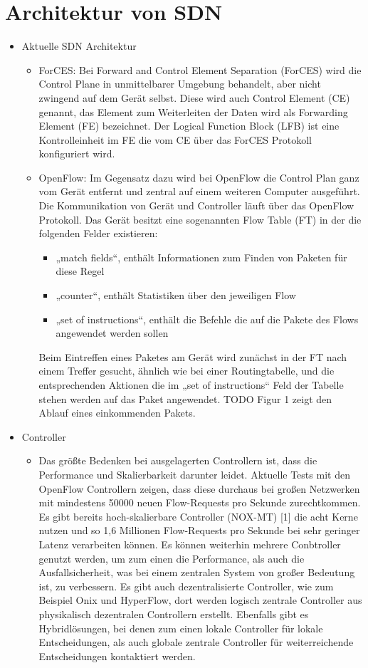 \documentclass[twoside,12pt]{scrartcl}
\begin{document}
	\section{Architektur von SDN}
	\begin{itemize}
		\item Aktuelle SDN Architektur
		\begin{itemize}
			\item ForCES: Bei Forward and Control Element Separation (ForCES) wird die Control Plane in unmittelbarer Umgebung behandelt, aber nicht zwingend auf dem Gerät selbst. Diese wird auch Control Element (CE) genannt, das Element zum Weiterleiten der Daten wird als Forwarding Element (FE) bezeichnet. Der Logical Function Block (LFB) ist eine Kontrolleinheit im FE die vom CE über das ForCES Protokoll konfiguriert wird.
			\item OpenFlow: Im Gegensatz dazu wird bei OpenFlow die Control Plan ganz vom Gerät entfernt und zentral auf einem weiteren Computer ausgeführt. Die Kommunikation von Gerät und Controller läuft über das OpenFlow Protokoll. Das Gerät besitzt eine sogenannten Flow Table (FT) in der die folgenden Felder existieren: 
			\begin{itemize}
				\item „match fields“, enthält Informationen zum Finden von Paketen für diese Regel
				\item „counter“, enthält Statistiken über den jeweiligen Flow
				\item „set of instructions“, enthält die Befehle die auf die Pakete des Flows angewendet werden sollen
				\end{itemize}
Beim Eintreffen eines Paketes am Gerät wird zunächst in der FT nach einem Treffer gesucht, ähnlich wie bei einer Routingtabelle, und die entsprechenden Aktionen die im „set of instructions“ Feld der Tabelle stehen werden auf das Paket angewendet.
TODO Figur 1 zeigt den Ablauf eines einkommenden Pakets.
		\end{itemize}
		\item Controller
		\begin{itemize}
			\item Das größte Bedenken bei ausgelagerten Controllern ist, dass die Performance und Skalierbarkeit darunter leidet. Aktuelle Tests mit den OpenFlow Controllern zeigen, dass diese durchaus bei großen Netzwerken mit mindestens 50000 neuen Flow-Requests pro Sekunde zurechtkommen. Es gibt bereits hoch-skalierbare Controller (NOX-MT) [1] die acht Kerne nutzen und so 1,6 Millionen Flow-Requests pro Sekunde bei sehr geringer Latenz verarbeiten können. Es können weiterhin mehrere Conbtroller genutzt werden, um zum einen die Performance, als auch die Ausfallsicherheit, was bei einem zentralen System von großer Bedeutung ist, zu verbessern. Es gibt auch dezentralisierte Controller, wie zum Beispiel Onix und HyperFlow, dort werden logisch zentrale Controller aus physikalisch dezentralen Controllern erstellt. Ebenfalls gibt es Hybridlösungen, bei denen zum einen lokale Controller für lokale Entscheidungen, als auch globale zentrale Controller für weiterreichende Entscheidungen kontaktiert werden.

\end{itemize}
\end{itemize}
\end{document}
